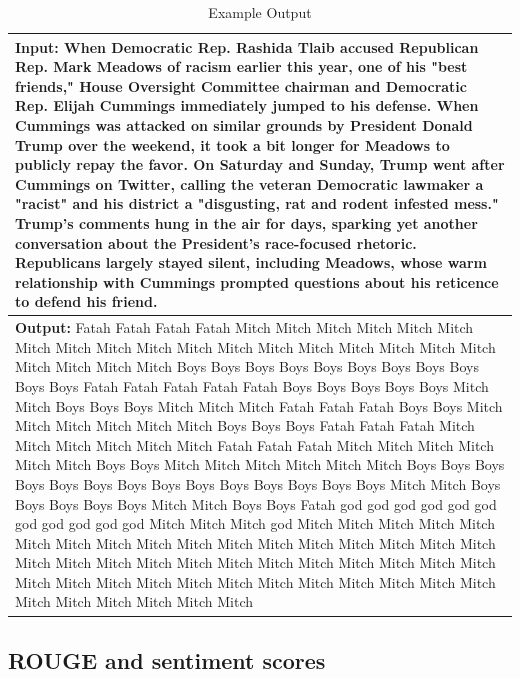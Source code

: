 \documentclass[11pt]{article}
\begin{document}
\begin{table}[h!]
\centering
\begin{tiny}
\begin{tabular}{|p{7cm}|} 
 \hline
 \textbf{Input:} When Democratic Rep. Rashida Tlaib accused Republican Rep. Mark Meadows of racism earlier this year, one of his "best friends," House Oversight Committee chairman and Democratic Rep. Elijah Cummings immediately jumped to his defense. When Cummings was attacked on similar grounds by President Donald Trump over the weekend, it took a bit longer for Meadows to publicly repay the favor. On Saturday and Sunday, Trump went after Cummings on Twitter, calling the veteran Democratic lawmaker a "racist" and his district a "disgusting, rat and rodent infested mess." Trump's comments hung in the air for days, sparking yet another conversation about the President's race-focused rhetoric. Republicans largely stayed silent, including Meadows, whose warm relationship with Cummings prompted questions about his reticence to defend his friend. \\ [0.5ex] 
 \hline
 \textbf{Output:} Fatah Fatah Fatah Fatah Mitch Mitch Mitch Mitch Mitch Mitch Mitch Mitch Mitch Mitch Mitch Mitch Mitch Mitch Mitch Mitch Mitch Mitch Mitch Mitch Mitch Mitch Boys Boys Boys Boys Boys Boys Boys Boys Boys Boys Boys Fatah Fatah Fatah Fatah Fatah Boys Boys Boys Boys Boys Mitch Mitch Boys Boys Boys Mitch Mitch Mitch Fatah Fatah Fatah Boys Boys Mitch Mitch Mitch Mitch Mitch Mitch Boys Boys Boys Fatah Fatah Fatah Mitch Mitch Mitch Mitch Mitch Mitch Fatah Fatah Fatah Mitch Mitch Mitch Mitch Mitch Mitch Boys Boys Mitch Mitch Mitch Mitch Mitch Mitch Boys Boys Boys Boys Boys Boys Boys Boys Boys Boys Boys Boys Boys Boys Mitch Mitch Boys Boys Boys Boys Boys Mitch Mitch Boys Boys Fatah god god god god god god god god god god god Mitch Mitch Mitch god Mitch Mitch Mitch Mitch Mitch Mitch Mitch Mitch Mitch Mitch Mitch Mitch Mitch Mitch Mitch Mitch Mitch Mitch Mitch Mitch Mitch Mitch Mitch Mitch Mitch Mitch Mitch Mitch Mitch Mitch Mitch Mitch Mitch Mitch Mitch Mitch Mitch Mitch Mitch Mitch Mitch Mitch Mitch Mitch Mitch Mitch Mitch  \\ 
 \hline
\end{tabular}
\end{tiny}
\caption{Example Output}
\label{table:3}
\end{table}

\subsection{ROUGE and sentiment scores}
\end{document}
